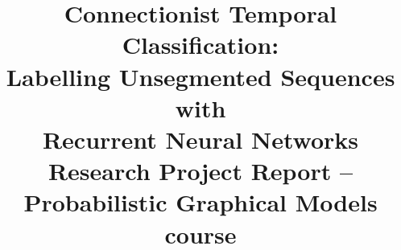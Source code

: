 \documentclass[11pt,a4paper]{article}
\begin{document}

\posttitle{\end{center}}
% 
\title{\huge Connectionist Temporal Classification: \\Labelling Unsegmented Sequences with \\Recurrent Neural Networks \\ \Large{Research Project Report -- Probabilistic Graphical Models course} }
\date{}
\end{document}
